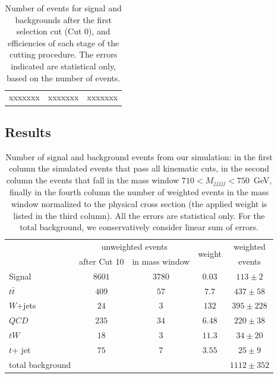 \begin{table}[htbH]
\label{tab:SelEff}
\begin{center}
\begin{tabular}{|c|c|c|}
xxxxxxx & xxxxxxx & xxxxxxx
\end{tabular}
\caption{Number of events for signal and backgrounds after the first selection cut (Cut 0), and efficiencies of each stage of the cutting procedure. The errors indicated are statistical only, based on the number of events.}
\end{center}
\end{table}

\subsection{Results}
\label{sec:Pres}

\begin{table}[tb]
\begin{center}
\begin{tabular}{l|c|c|c|c}
 & \multicolumn{2}{c|}{unweighted events}  & \multirow{2}{*}{weight} & weighted  \\
 & after Cut 10 & in mass window & & events \\
 \hline
 Signal & $8601$ & $3780$ & $0.03$ &$113 \pm 2$ \\
 \hline
   $t \bar{t}$ & $409$ & $57$ & $7.7$ & $437 \pm 58$ \\
 $W$+jets & $24$ & $3$ & $132$ & $395 \pm 228$ \\
 $QCD$ & $235$ & $34$ & $6.48$ & $220 \pm 38$ \\
 $tW$ & $18$ & $3$ & $11.3$ & $34 \pm 20$ \\
 $t$+ jet & $75$ & $7$ & $3.55$ & $25 \pm 9$ \\
  \hline
  total background & & & & $1112 \pm 352$ \\
\end{tabular}
\caption{Number of signal and background events from our simulation: in the first column the simulated events that pass all kinematic cuts, in the second column the events that fall in the mass window $710 < M_{jjjjj} < 750$~GeV, finally in the fourth column the number of weighted events in the mass window normalized to the physical cross section (the applied weight is listed in the third column). All the errors are statistical only. For the total background, we conservatively consider linear sum of errors.} \label{tab:events} \end{center}
\end{table}

